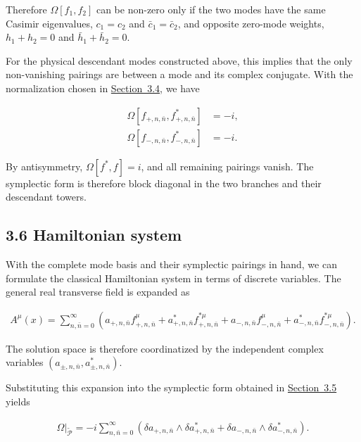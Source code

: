 Therefore $\Omega[f_1,f_2]$ can be non-zero only if the two modes have the same Casimir eigenvalues, $c_1=c_2$ and $\bar c_1=\bar c_2$, and opposite zero-mode weights, $h_1+h_2=0$ and $\bar h_1+\bar h_2=0$.

For the physical descendant modes constructed above, this implies that the only non-vanishing pairings are between a mode and its complex conjugate. With the normalization chosen in \hyperref[subsec:solving-modes]{Section~3.4}, we have

 \begin{align}
\Omega[f_{+,n,\bar{n}}, f^{*}_{+,n,\bar{n}}] & = -i, \\
\Omega[f_{-,n,\bar{n}}, f^{*}_{-,n,\bar{n}}] & = -i.
\end{align}

By antisymmetry, $\Omega[f^*,f]=i$, and all remaining pairings vanish. The symplectic form is therefore block diagonal in the two branches and their descendant towers.

\subsection{3.6 Hamiltonian system}\label{subsec:discrete-hamiltonian-system}

With the complete mode basis and their symplectic pairings in hand, we can formulate the classical Hamiltonian system in terms of discrete variables. The general real transverse field is expanded as

\begin{align}
A^{\mu}(x) = \sum_{n,\bar{n}=0}^{\infty} \left( a_{+,n,\bar{n}} f^{\mu}_{+,n,\bar{n}} + a^{*}_{+,n,\bar{n}} f^{*\mu}_{+,n,\bar{n}} + a_{-,n,\bar{n}} f^{\mu}_{-,n,\bar{n}} + a^{*}_{-,n,\bar{n}} f^{*\mu}_{-,n,\bar{n}} \right).
\end{align}

The solution space is therefore coordinatized by the independent complex variables $(a_{\pm,n,\bar{n}}, a^{*}_{\pm,n,\bar{n}})$.

Substituting this expansion into the symplectic form obtained in \hyperref[subsec:symplectic-form]{Section~3.5} yields

\begin{align}
\Omega\big|_{\widetilde{\mathcal{P}}} = -i \sum_{n,\bar{n}=0}^{\infty} \left( \delta a_{+,n,\bar{n}} \wedge \delta a^{*}_{+,n,\bar{n}} + \delta a_{-,n,\bar{n}} \wedge \delta a^{*}_{-,n,\bar{n}} \right).
\end{align}

